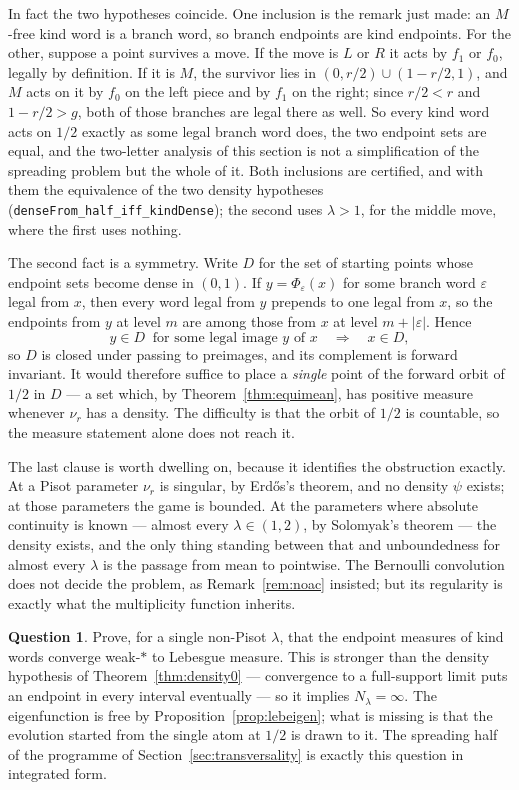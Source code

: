 \documentclass[11pt,reqno]{amsart}
\theoremstyle{plain}
\theoremstyle{definition}
\newtheorem{question}[theorem]{Question}
\theoremstyle{remark}
\begin{document}
In fact the two hypotheses coincide. One inclusion is the remark just made:
an $M$-free kind word is a branch word, so branch endpoints are kind
endpoints. For the other, suppose a point survives a move. If the move is $L$
or $R$ it acts by $f_1$ or $f_0$, legally by definition. If it is $M$, the
survivor lies in $(0,r/2)\cup(1-r/2,1)$, and $M$ acts on it by $f_0$ on the
left piece and by $f_1$ on the right; since $r/2<r$ and $1-r/2>g$, both of
those branches are legal there as well. So every kind word acts on $1/2$
exactly as some legal branch word does, the two endpoint sets are equal, and
the two-letter analysis of this section is not a simplification of the
spreading problem but the whole of it. Both inclusions are certified, and with
them the equivalence of the two density hypotheses
(\texttt{denseFrom\_half\_iff\_kindDense}); the second uses $\lambda>1$, for
the middle move, where the first uses nothing.

The second fact is a symmetry. Write $D$ for the set of starting
points whose endpoint sets become dense in $(0,1)$. If $y=\Phi_\varepsilon(x)$
for some branch word $\varepsilon$ legal from $x$, then every word legal from
$y$ prepends to one legal from $x$, so the endpoints from $y$ at level $m$ are
among those from $x$ at level $m+|\varepsilon|$. Hence
\[
  y\in D\ \text{ for some legal image }y\text{ of }x
  \quad\Longrightarrow\quad x\in D,
\]
so $D$ is closed under passing to preimages, and its complement is forward
invariant. It would therefore suffice to place a \emph{single} point of the
forward orbit of $1/2$ in $D$ --- a set which, by
Theorem~\ref{thm:equimean}, has positive measure whenever $\nu_r$ has a
density. The difficulty is that the orbit of $1/2$ is countable, so the
measure statement alone does not reach it.

The last clause is worth dwelling on, because it identifies the obstruction
exactly. At a Pisot parameter $\nu_r$ is singular, by Erd\H{o}s's theorem, and
no density $\psi$ exists; at those parameters the game is bounded. At the
parameters where absolute continuity is known --- almost every
$\lambda\in(1,2)$, by Solomyak's theorem --- the density exists, and the only
thing standing between that and unboundedness for almost every $\lambda$ is
the passage from mean to pointwise. The Bernoulli convolution does not decide
the problem, as Remark~\ref{rem:noac} insisted; but its regularity is exactly
what the multiplicity function inherits.

\begin{question}\label{q:equi}
Prove, for a single non-Pisot $\lambda$, that the endpoint measures of kind
words converge weak-$*$ to Lebesgue measure. This is stronger than the
density hypothesis of Theorem~\ref{thm:density0} --- convergence to a
full-support limit puts an endpoint in every interval eventually --- so it
implies $N_\lambda=\infty$. The eigenfunction is free by
Proposition~\ref{prop:lebeigen}; what is missing is that the evolution
started from the single atom at $1/2$ is drawn to it. The spreading half of
the programme of Section~\ref{sec:transversality} is exactly this question in
integrated form.
\end{question}
\end{document}
